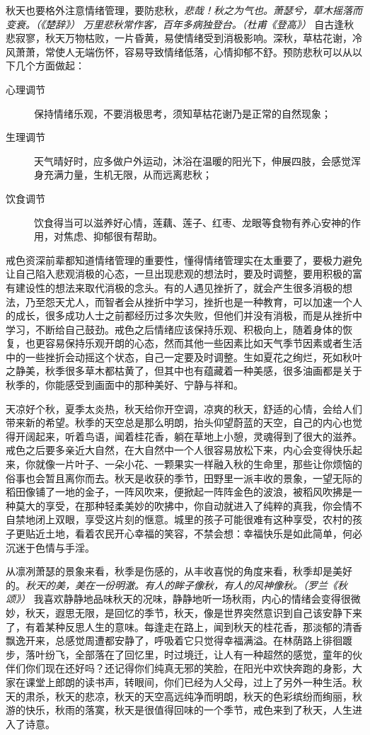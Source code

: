 秋天也要格外注意情绪管理，要防悲秋，\textit{悲哉！秋之为气也。萧瑟兮，草木摇落而变衰。（《楚辞》）} \textit{万里悲秋常作客，百年多病独登台。（杜甫《登高》）} 自古逢秋悲寂寥，秋天万物枯败，一片昏黄，易使情绪受到消极影响。深秋，草枯花谢，冷风萧萧，常使人无端伤怀，容易导致情绪低落，心情抑郁不舒。预防悲秋可以从以下几个方面做起：

\begin{description}
    \item[心理调节] 保持情绪乐观，不要消极思考，须知草枯花谢乃是正常的自然现象；
    \item[生理调节] 天气晴好时，应多做户外运动，沐浴在温暖的阳光下，伸展四肢，会感觉浑身充满力量，生机无限，从而远离悲秋；
    \item[饮食调节] 饮食得当可以滋养好心情，莲藕、莲子、红枣、龙眼等食物有养心安神的作用，对焦虑、抑郁很有帮助。
\end{description}

戒色资深前辈都知道情绪管理的重要性，懂得情绪管理实在太重要了，要极力避免让自己陷入悲观消极的心态，一旦出现悲观的想法时，要及时调整，要用积极的富有建设性的想法来取代消极的念头。有的人遇见挫折了，就会产生很多消极的想法，乃至怨天尤人，而智者会从挫折中学习，挫折也是一种教育，可以加速一个人的成长，很多成功人士之前都经历过多次失败，但他们并没有消极，而是从挫折中学习，不断给自己鼓劲。戒色之后情绪应该保持乐观、积极向上，随着身体的恢复，也更容易保持乐观开朗的心态，然而其他一些因素比如天气季节因素或者生活中的一些挫折会动摇这个状态，自己一定要及时调整。生如夏花之绚烂，死如秋叶之静美，秋季很多草木都枯黄了，但其中也有蕴藏着一种美感，很多油画都是关于秋季的，你能感受到画面中的那种美好、宁静与祥和。

天凉好个秋，夏季太炎热，秋天给你开空调，凉爽的秋天，舒适的心情，会给人们带来新的希望。秋季的天空总是那么明朗，抬头仰望蔚蓝的天空，自己的内心也觉得开阔起来，听着鸟语，闻着桂花香，躺在草地上小憩，灵魂得到了很大的滋养。戒色之后要多亲近大自然，在大自然中一个人很容易放松下来，内心会变得快乐起来，你就像一片叶子、一朵小花、一颗果实一样融入秋的生命里，那些让你烦恼的俗事也会暂且离你而去。秋天是收获的季节，田野里一派丰收的景象，一望无际的稻田像铺了一地的金子，一阵风吹来，便掀起一阵阵金色的波浪，被稻风吹拂是一种莫大的享受，在那种轻柔美妙的吹拂中，你自动就进入了纯粹的真我，你会情不自禁地闭上双眼，享受这片刻的惬意。城里的孩子可能很难有这种享受，农村的孩子更贴近土地，看着农民开心幸福的笑容，不禁会想：幸福快乐是如此简单，何必沉迷于色情与手淫。

从凛冽萧瑟的景象来看，秋季是伤感的，从丰收喜悦的角度来看，秋季却是美好的。\textit{秋天的美，美在一份明澈。有人的眸子像秋，有人的风神像秋。（罗兰《秋颂》）} 我喜欢静静地品味秋天的况味，静静地听一场秋雨，内心的情绪会变得很微妙，秋天，遐思无限，是回忆的季节，秋天，像是世界突然意识到自己该安静下来了，有着某种反思人生的意味。每逢走在路上，闻到秋天的桂花香，那淡郁的清香飘逸开来，总感觉周遭都安静了，呼吸着它只觉得幸福满溢。在林荫路上徘徊踱步，落叶纷飞，全部落在了回忆里，时过境迁，让人有一种超然的感觉，童年的伙伴们你们现在还好吗？还记得你们纯真无邪的笑脸，在阳光中欢快奔跑的身影，大家在课堂上郎朗的读书声，转眼间，你们已经为人父母，过上了另外一种生活。秋天的肃杀，秋天的悲凉，秋天的天空高远纯净而明朗，秋天的色彩缤纷而绚丽，秋游的快乐，秋雨的落寞，秋天是很值得回味的一个季节，戒色来到了秋天，人生进入了诗意。

